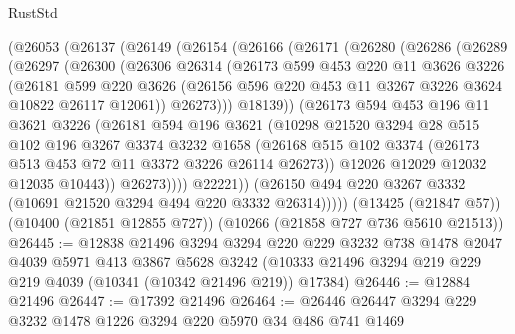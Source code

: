 \begin{lexlean}{RustStd}
\begin{coremodule}
{\begin{coremodule}
{{{{{{{{{{{{{{{{{{{{{{{{{    (@26053
      (@26137
        (@26149
          (@26154
            (@26166
              (@26171
                (@26280
                  (@26286
                    (@26289
                      (@26297
                        (@26300
                          (@26306
                            @26314
                            (@26173
                              @599
                              @453
                              @220
                              @11
                              @3626
                              @3226
                              (@26181
                                @599
                                @220
                                @3626
                                (@26156 @596 @220 @453 @11 @3267 @3226 @3624 @10822 @26117 @12061))
                              @26273)))
                        @18139))
                    (@26173
                      @594
                      @453
                      @196
                      @11
                      @3621
                      @3226
                      (@26181
                        @594
                        @196
                        @3621
                        (@10298
                          @21520
                          @3294
                          @28
                          @515
                          @102
                          @196
                          @3267
                          @3374
                          @3232
                          @1658
                          (@26168
                            @515
                            @102
                            @3374
                            (@26173 @513 @453 @72 @11 @3372 @3226 @26114 @26273))
                          @12026
                          @12029
                          @12032
                          @12035
                          @10443))
                      @26273))))
              @22221))
          (@26150 @494 @220 @3267 @3332 (@10691 @21520 @3294 @494 @220 @3332 @26314)))))
    (@13425 (@21847 @57))
    (@10400 (@21851 @12855 @727))
    (@10266 (@21858 @727 @736 @5610 @21513))
@26445 := @12838
    @21496
    @3294
    @3294
    @220
    @229
    @3232
    @738
    @1478
    @2047
    @4039
    @5971
    @413
    @3867
    @5628
    @3242
    (@10333 @21496 @3294 @219 @229 @219 @4039 (@10341 (@10342 @21496 @219)) @17384)
@26446 := @12884 @21496
@26447 := @17392 @21496
@26464 := @26446
    @26447
    @3294
    @229
    @3232
    @1478
    @1226
    @3294
    @220
    @5970
    @34
    @486
    @741
    @1469
}}}}}}}}}}}}}}}}}}}}}}}}}
\end{coremodule}}
\end{coremodule}
\end{lexlean}
